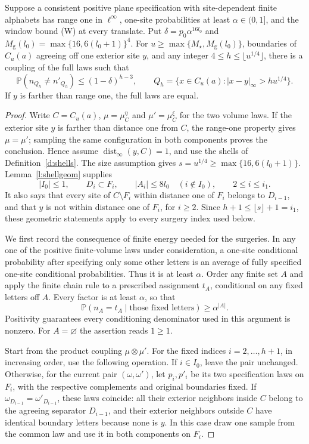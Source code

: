 \begin{lemma}\label{l:stopped}
Suppose a consistent positive plane specification with site-dependent
finite alphabets has range one in \(\ell^\infty\), one-site probabilities
at least \(\alpha\in(0,1]\), and the window bound (W) at every translate.
Put \(\delta=p_0\alpha^{16l_0}\) and
\(M_{\mathrm g}(l_0)=\max\{16,6(l_0+1)\}^4\).
For \(u\ge\max\{M_\star,M_{\mathrm g}(l_0)\}\), boundaries of \(C_u(a)\)
agreeing off one exterior site \(y\), and any integer
\(4\le h\le\lfloor u^{1/4}\rfloor\), there is a coupling of the
full laws such that
\[
 \mathbb P(n_{Q_h}\ne n'_{Q_h})\le(1-\delta)^{h-3},
 \qquad Q_h=\{x\in C_u(a):|x-y|_\infty>hu^{1/4}\}.
\]
If \(y\) is farther than range one, the full laws are equal.
\end{lemma}

\begin{proof}
Write \(C=C_u(a)\), \(\mu=\mu_C^\eta\) and
\(\mu'=\mu_C^\xi\) for the two volume laws.  If the exterior site
\(y\) is farther than distance one from \(C\), the range-one property
gives \(\mu=\mu'\); sampling the same configuration in both
components proves the conclusion.  Hence assume
\(\operatorname{dist}_\infty(y,C)=1\), and use the shells of
Definition~\ref{d:shells}.  The size assumption gives
\(s=u^{1/4}\ge\max\{16,6(l_0+1)\}\).
Lemma~\ref{l:shellgeom} supplies
\[
 |I_0|\le1,\qquad D_i\subset F_i,
 \qquad |A_i|\le8l_0\quad(i\notin I_0),
 \qquad 2\le i\le i_1.
\]
It also says that every site of \(C\setminus F_i\) within distance
one of \(F_i\) belongs to \(D_{i-1}\), and that \(y\) is not
within distance one of \(F_i\), for \(i\ge2\).
Since \(h+1\le\lfloor s\rfloor+1=i_1\), these geometric statements
apply to every surgery index used below.

We first record the consequence of finite energy needed for the
surgeries.  In any one of the positive finite-volume laws under
consideration, a one-site conditional probability after specifying
only some other letters is an average of fully specified one-site
conditional probabilities.  Thus it is at least \(\alpha\).
Order any finite set \(A\) and apply the finite chain rule to a
prescribed assignment \(t_A\), conditional on any fixed letters off
\(A\).  Every factor is at least \(\alpha\), so that
\[
 \mathbb P(n_A=t_A\mid\text{those fixed letters})
                      \ge\alpha^{|A|}.
\]
Positivity guarantees every conditioning denominator used in this
argument is nonzero.  For \(A=\varnothing\) the assertion reads
\(1\ge1\).

Start from the product coupling \(\mu\otimes\mu'\).  For the fixed
indices \(i=2,\ldots,h+1\), in increasing order, use the following
operation.  If \(i\in I_0\), leave the pair unchanged.  Otherwise,
for the current pair \((\omega,\omega')\), let \(p_i,p'_i\) be its
two specification laws on \(F_i\), with the respective complements
and original boundaries fixed.  If
\(\omega_{D_{i-1}}=\omega'_{D_{i-1}}\), these laws coincide:
all their exterior neighbors inside \(C\) belong to the agreeing
separator \(D_{i-1}\), and their exterior neighbors outside \(C\)
have identical boundary letters because none is \(y\).  In this
case draw one sample from the common law and use it in both components
on \(F_i\).


\end{proof}
